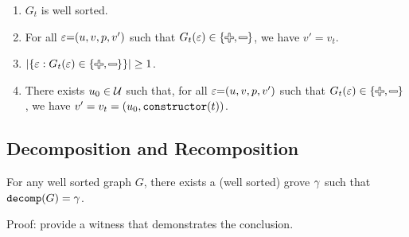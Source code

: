 \begin{definition}
\begin{itemize}
\begin{enumerate}
        \item $G_t$ is well sorted.
        \item For all $\varepsilon{=}(u, v, p, v')$ such that $G_t(\e) \in \SetOf{\Plus, \Minus}$,
          we have $v' = v_t$.
        \item $\SizeOf{\SetOf{\e \SuchThat{G_t(\e) \in \SetOf{\Plus, \Minus}}}} \geq 1$.
        \item There exists $u_0 \in \mathcal{U}$ such that,
          for all $\varepsilon{=}(u, v, p, v')$ such that $G_t(\e) \in \SetOf{\Plus, \Minus}$,
          we have $v' = v_t = (u_0, \operatorname{\texttt{constructor}}\mathopen{}\left(t\right)\mathclose{})$.
      \end{enumerate}
  \end{itemize}
\end{definition}



\subsection{Decomposition and Recomposition}

\begin{theorem}
  For any well sorted graph $G$,
  there exists a (well sorted) grove $\gamma$
  such that $\operatorname{\texttt{decomp}}\mathopen{}\left(G\right)\mathclose{} = \gamma$.
\end{theorem}

Proof: provide a witness that demonstrates the conclusion.



\figureDecompositionDefHelpersContent

